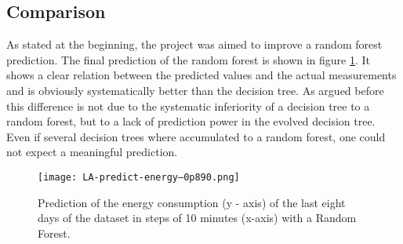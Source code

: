 \documentclass[conference]{IEEEtran}
\begin{document}
\begin{figure*}[!t]
\centerline{
\hfil
{}}
\caption{Analysis of the lowest final MSE of all runs.}
\label{fig:winner}
\end{figure*}


\begin{figure*}[!t]
\centerline{
\hfil
{}}
\caption{Analysis of the lowest prediction MSE of all runs.}
\label{fig:best}
\end{figure*}

\subsection{Comparison}
As stated at the beginning, the project was aimed to improve a random forest prediction. The final prediction of the random forest is shown in figure \ref{fig:random_forest}. It shows a clear relation between the predicted values and the actual measurements and is obviously systematically better than the decision tree. As argued before this difference is not due to the systematic inferiority of a decision tree to a random forest, but to a lack of prediction power in the evolved decision tree. Even if several decision trees where accumulated to a random forest, one could not expect a meaningful prediction.

\begin{figure}[!t] 
\centering 
\texttt{[image: LA-predict-energy--0p890.png]} 
\caption{Prediction of the energy consumption (y - axis) of the last eight days of the dataset in steps of 10 minutes (x-axis) with a Random Forest.} 
\label{fig:random_forest} 
\end{figure}
\end{document}
